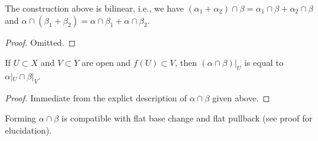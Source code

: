 \begin{lemma}
\label{lemma-action-bilinear}
The construction above is bilinear, i.e., we have
$(\alpha_1 + \alpha_2) \cap \beta = \alpha_1 \cap \beta +
\alpha_2 \cap \beta$ and $\alpha \cap (\beta_1 + \beta_2) =
\alpha \cap \beta_1 + \alpha \cap \beta_2$.
\end{lemma}

\begin{proof}
Omitted.
\end{proof}

\begin{lemma}
\label{lemma-action-opens}
If $U \subset X$ and $V \subset Y$ are open and $f(U) \subset V$, then
$(\alpha \cap \beta)|_U$ is equal to $\alpha|_U \cap \beta|_V$.
\end{lemma}

\begin{proof}
Immediate from the explict description of $\alpha \cap \beta$
given above.
\end{proof}

\begin{lemma}
\label{lemma-action-base-change}
Forming $\alpha \cap \beta$ is compatible with flat base change
and flat pullback (see proof for elucidation).
\end{lemma}

